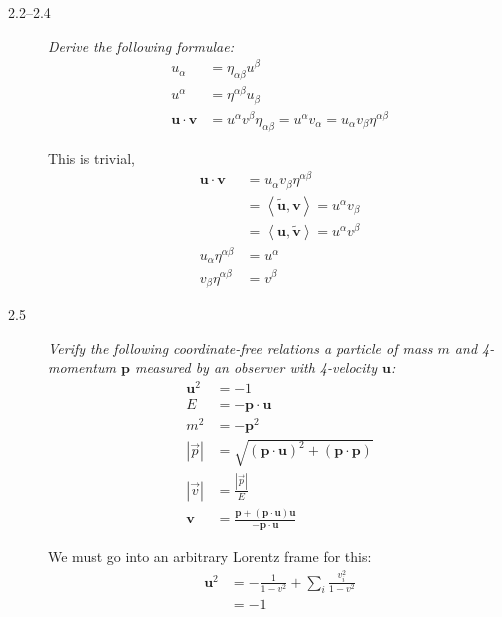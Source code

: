 \documentclass[12pt]{report}
\newcommand{\abs}[1]{\left|#1\right|}
\newcommand{\expvalue}[1]{\left<#1\right>}
\begin{document}
\begin{description}
    \item[2.2--2.4] \emph{Derive the following formulae:}
        \begin{align*}
            u_\alpha &= \eta_{\alpha\beta}u^\beta\\
            u^\alpha &= \eta^{\alpha\beta}u_\beta\\
            \mathbf{u} \cdot \mathbf{v} &= u^\alpha v^\beta \eta_{\alpha\beta}
                = u^\alpha v_\alpha
                = u_\alpha v_\beta \eta^{\alpha\beta}
        \end{align*}

        This is trivial,
        \begin{align}
            \mathbf{u} \cdot \mathbf{v} &= u_\alpha v_\beta \eta^{\alpha\beta}
                \nonumber\\
            &= \expvalue{\mathbf{\tilde{u}}, \mathbf{v}} = u^\alpha v_\beta
                \nonumber\\
            &= \expvalue{\mathbf{u}, \mathbf{\tilde{v}}} = u^\alpha v^\beta
                \nonumber\\
            u_\alpha \eta^{\alpha\beta} &= u^\alpha\\
            v_\beta \eta^{\alpha\beta} &= v^\beta
        \end{align}

    \item[2.5] \emph{Verify the following coordinate-free relations a particle
        of mass $m$ and 4-momentum $\mathbf{p}$ measured by an observer with
        4-velocity $\mathbf{u}$:}
        \begin{align*}
            \mathbf{u}^2 &= -1\\
            E &= -\mathbf{p} \cdot \mathbf{u}\\
            m^2 &= -\mathbf{p}^2\\
            \abs{\vec{p}} &= \sqrt{(\mathbf{p} \cdot \mathbf{u})^2 +
                (\mathbf{p} \cdot \mathbf{p})}\\
            \abs{\vec{v}} &= \frac{\abs{\vec{p}}}{E}\\
            \mathbf{v} &= \frac{\mathbf{p + (\mathbf{p} \cdot
                \mathbf{u})\mathbf{u}}}{-\mathbf{p} \cdot \mathbf{u}}
        \end{align*}

        We must go into an arbitrary Lorentz frame for this:
        \begin{align}
            \mathbf{u}^2 &= -\frac{1}{1 - v^2} + \sum\limits_{i}^{}
                \frac{v_i^2}{1 - v^2} \nonumber\\
            &= -1
        \end{align}


\end{description}
\end{document}

